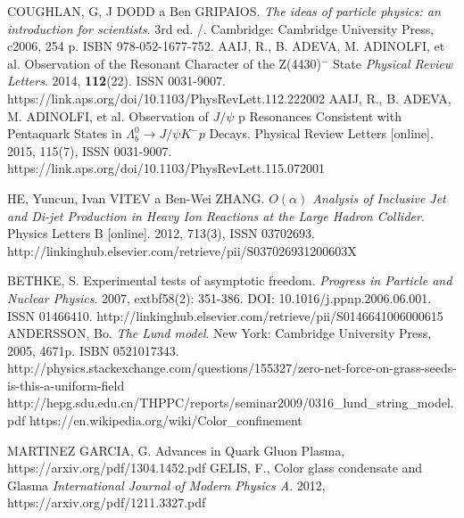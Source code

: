 \documentclass[thesismargins, thesislinespacing]{rnthesis}
\begin{document}
\renewcommand{\bibname}{Zoznam pou�itej literat�ry}
\begin{thebibliography}{}
COUGHLAN, G, J DODD a Ben GRIPAIOS. \textit{The ideas of particle physics: an introduction for scientists}. 3rd ed. /. Cambridge: Cambridge University Press, c2006, 254 p. ISBN 978-052-1677-752.
AAIJ, R., B. ADEVA, M. ADINOLFI, et al. Observation of the Resonant Character of the Z(4430)$^{-}$ State \textit{Physical Review Letters}. 2014, \textbf{112}(22). ISSN 0031-9007. https://link.aps.org/doi/10.1103/PhysRevLett.112.222002
AAIJ, R., B. ADEVA, M. ADINOLFI, et al. Observation of $J / \psi$ p Resonances Consistent with Pentaquark States in $\Lambda_b^0 \rightarrow J / \psi K^{-}p$ Decays. Physical Review Letters [online]. 2015, 115(7),  ISSN 0031-9007. https://link.aps.org/doi/10.1103/PhysRevLett.115.072001

HE, Yuncun, Ivan VITEV a Ben-Wei ZHANG. 
\textit{ $O(\alpha)$ Analysis of Inclusive Jet and Di-jet Production in Heavy Ion Reactions at the Large Hadron Collider}. Physics Letters B [online]. 2012, 713(3), ISSN 03702693. http://linkinghub.elsevier.com/retrieve/pii/S037026931200603X

BETHKE, S. Experimental tests of asymptotic freedom. \textit{Progress in Particle and Nuclear Physics}. 2007, extbf{58}(2): 351-386. DOI: 10.1016/j.ppnp.2006.06.001. ISSN 01466410.  http://linkinghub.elsevier.com/retrieve/pii/S0146641006000615
ANDERSSON, Bo. \textit{The Lund model}. New York: Cambridge University Press, 2005, 4671p. ISBN 0521017343.
http://physics.stackexchange.com/questions/155327/zero-net-force-on-grass-seeds-is-this-a-uniform-field
http://hepg.sdu.edu.cn/THPPC/reports/seminar2009/0316\_lund\_string\_model.pdf
https://en.wikipedia.org/wiki/Color\_confinement

MARTINEZ GARCIA, G. Advances in Quark Gluon Plasma, https://arxiv.org/pdf/1304.1452.pdf
GELIS, F., Color glass condensate and Glasma \textit{International Journal of Modern Physics A}. 2012, https://arxiv.org/pdf/1211.3327.pdf


\end{thebibliography}
\end{document}
